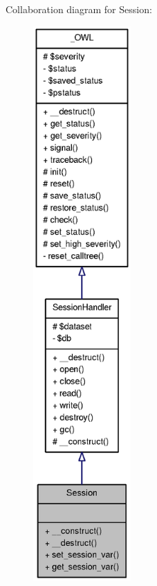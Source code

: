 Collaboration diagram for Session:\nopagebreak
\begin{figure}[H]
\begin{center}
\leavevmode
\includegraphics[height=600pt]{classSession__coll__graph}
\end{center}
\end{figure}
